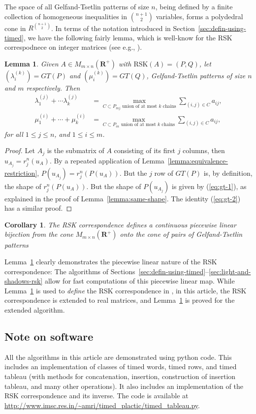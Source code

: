 \documentclass[10pt]{amsproc}
\newtheorem{lemma}[theorem]{Lemma}
\newtheorem{corollary}[theorem]{Corollary}
\theoremstyle{definition}
\theoremstyle{remark}
\newcommand{\rp}{\mathbf{R}^+}
\newcommand{\rsk}{\mathrm{RSK}}
\begin{document}
The space of all Gelfand-Tsetlin patterns of size $n$, being defined by a finite collection of homogeneous inequalities in $\binom{n+1}2$ variables, forms a polydedral cone in $R^{\binom{n+1}2}$.
In terms of the notation introduced in Section~\ref{sec:defin-using-timed}, we have the following fairly lemma, which is well-know for the RSK correspodnece on integer matrices (see e.g., \cite[Prop.~2.26]{kir-trop}).
\begin{lemma}
  \label{lemma:pl}
  Given $A\in M_{m\times n}(\rp)$ with $\rsk(A)=(P,Q)$, let $(\lambda^{(k)}_i)=GT(P)$ and $(\mu^{(k)}_i)=GT(Q)$, Gelfand-Tsetlin patterns of size $n$ and $m$ respectively.
  Then
  \begin{align}
    \label{eq:gt-1}
    \lambda^{(j)}_1 + \dotsb \lambda_k^{(j)} & = \max_{C\subset P_{mj}\text{ union of at most $k$ chains}} \sum_{(i,j)\in C} a_{ij},\\
    \label{eq:gt-2}
    \mu_1^{(i)} + \dotsb + \mu_k^{(i)} & = \max_{C\subset P_{in}\text{ union of at most $k$ chains}} \sum_{(i,j)\in C} a_{ij},
  \end{align}
  for all $1\leq j\leq n$, and $1\leq i\leq m$.
\end{lemma}
\begin{proof}
  Let $A_j$ is the submatrix of $A$ consisting of its first $j$ columns, then $u_{A_j} = r^n_j(u_A)$.
  By a repeated application of Lemma~\ref{lemma:equivalence-restriction}, $P(u_{A_j}) = r^n_j(P(u_A))$.
  But the $j$ row of $GT(P)$ is, by definition, the shape of $r^n_j(P(u_A))$.
  But the shape of $P(u_{A_j})$ is given by (\ref{eq:gt-1}), as explained in the proof of Lemma~\ref{lemma:same-shape}.
  The identity (\ref{eq:gt-2}) has a similar proof.
\end{proof}
\begin{corollary}
  The RSK correspondence defines a continuous piecewise linear bijection from the cone $M_{m\times n}(\rp)$ onto the cone of pairs of Gelfand-Tsetlin patterns 
\end{corollary}
Lemma~\ref{lemma:pl} clearly demonstrates the piecewise linear nature of the RSK correspondence:
The algorithms of Sections~\ref{sec:defin-using-timed}--\ref{sec:light-and-shadows-rsk} allow for fast computations of this piecewise linear map.
While Lemma~\ref{lemma:pl} is used to \emph{define} the RSK correspondence in \cite{kir-trop}, in this article, the RSK correspondence is extended to real matrices, and Lemma~\ref{lemma:pl} is proved for the extended algorithm.
\subsection{Note on software}
\label{sec:software}
All the algorithms in this article are demonstrated using python code.
This includes an implementation of classes of timed words, timed rows, and timed tableau (with methods for concatenation, insertion, construction of insertion tableau, and many other operations).
It also includes an implementation of the RSK correspondence and its inverse.
The code is available at \url{http://www.imsc.res.in/~amri/timed_plactic/timed_tableau.py}.
\end{document}

